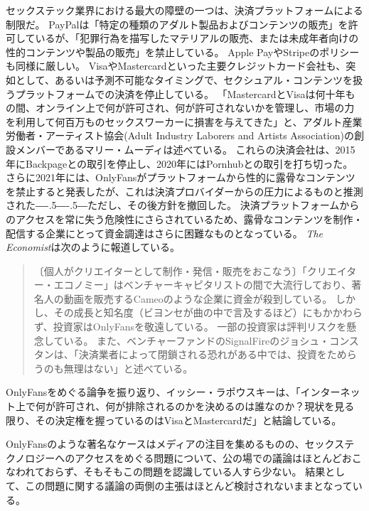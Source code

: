 \documentclass[paper=a4,book,openany]{jlreq}
\newcommand{\ig}[1]{}           %
\def\DDASH{―\kern-.5\zw―\kern-.5\zw―}
\begin{document}
セックステック業界における最大の障壁の一つは、決済プラットフォームによる制限だ。
PayPalは「特定の種類のアダルト製品およびコンテンツの販売」を許可しているが、「犯罪行為を描写したマテリアルの販売、または未成年者向けの性的コンテンツや製品の販売」を禁止している\citep{fearnow20:_porn_indus_stars_turn_crypt}。
Apple PayやStripeのポリシーも同様に厳しい。
VisaやMastercardといった主要クレジットカード会社も、突如として、あるいは予測不可能なタイミングで、セクシュアル・コンテンツを扱うプラットフォームでの決済を停止している。
「MastercardとVisaは何十年もの間、オンライン上で何が許可され、何が許可されないかを管理し、市場の力を利用して何百万ものセックスワーカーに損害を与えてきた」と、アダルト産業労働者・アーティスト協会(Adult Industry Laborers and Artists Association)の創設メンバーであるマリー・ムーディ\ig{Mary Moody}は述べている\citep{cole21:_i_felt_betray}。
これらの決済会社は、2015年にBackpageとの取引を停止し、2020年にはPornhubとの取引を打ち切った。
さらに2021年には、OnlyFansがプラットフォームから性的に露骨なコンテンツを禁止すると発表したが、これは決済プロバイダーからの圧力によるものと推測された{\DDASH}ただし、その後方針を撤回した。
決済プラットフォームからのアクセスを常に失う危険性にさらされているため、露骨なコンテンツを制作・配信する企業にとって資金調達はさらに困難なものとなっている\citep{sesta18:_platf_which_discr_sex_worker}。
\emph{The Economist}は次のように報道している。

\begin{quote}
〔個人がクリエイターとして制作・発信・販売をおこなう〕「クリエイター・エコノミー」はベンチャーキャピタリストの間で大流行しており、著名人の動画を販売するCameoのような企業に資金が殺到している。
しかし、その成長と知名度（ビヨンセが曲の中で言及するほど）にもかかわらず、投資家はOnlyFansを敬遠している。
一部の投資家は評判リスクを懸念している。
また、ベンチャーファンドのSignalFireのジョシュ・コンスタンは、「決済業者によって閉鎖される恐れがある中では、投資をためらうのも無理はない」と述べている。
\citep{economist21:_onlyf_u_turns_its_porn_ban}
\end{quote}

OnlyFansをめぐる論争を振り返り、イッシー・ラポウスキー\ig{Issue Lapowsky}は、「インターネット上で何が許可され、何が排除されるのかを決めるのは誰なのか？現状を見る限り、その決定権を握っているのはVisaとMastercardだ」と結論している\citep{lapowsky21:_onlyf_shows_visa_master_are}。

OnlyFansのような著名なケースはメディアの注目を集めるものの、セックステクノロジーへのアクセスをめぐる問題について、公の場での議論はほとんどおこなわれておらず、そもそもこの問題を認識している人すら少ない。
結果として、この問題に関する議論の両側の主張はほとんど検討されないままとなっている。
\end{document}
